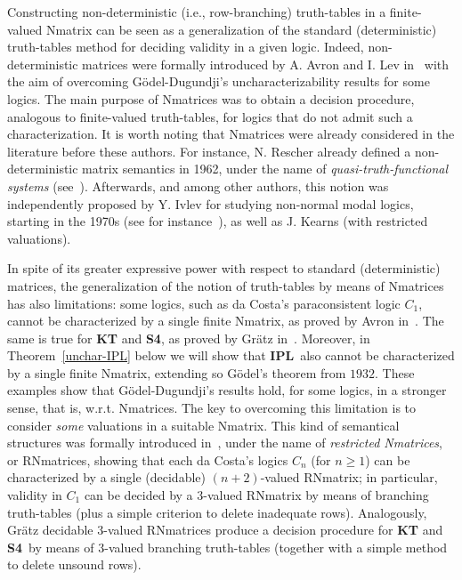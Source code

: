 \documentclass[12pt]{article}
\newcommand{\ipl}{\ensuremath{\mathbf{IPL}}}
\newcommand{\sfo}{\textbf{S4}}
\begin{document}
Constructing non-deterministic (i.e., row-branching) truth-tables in a finite-valued Nmatrix can be seen as a generalization of the standard (deterministic) truth-tables method for deciding validity in a given logic. 
Indeed, non-deterministic matrices were formally introduced by A. Avron and I. Lev in~\cite{avr:lev:01} with the aim of overcoming G\"odel-Dugundji's uncharacterizability results for some logics. The main purpose of Nmatrices was to obtain a decision procedure, analogous to finite-valued truth-tables, for logics that do not admit such a characterization.  It is worth noting that Nmatrices were already considered in the literature before these authors. For instance, N. Rescher already defined a non-deterministic matrix semantics in 1962, under the name of {\em quasi-truth-functional systems} (see~\cite{resch:62}). Afterwards, and among other authors,  this notion was independently proposed by Y. Ivlev for studying non-normal modal logics, starting in the 1970s (see for instance~\cite{ivl:73,ivl:86,ivl:88,ivl:24}), as well as J. Kearns (with restricted valuations).

In spite of its greater expressive power with respect to standard (deterministic) matrices, the generalization of the notion of truth-tables by means of Nmatrices has also limitations:  some logics, such as da Costa's paraconsistent logic $C_1$, cannot be characterized by a single finite Nmatrix, as proved by Avron in~\cite[Theorem~11]{avron:2007}.
The same is true for  \textbf{KT} and \textbf{S4}, as proved by Gr\"atz in~\cite{gratz_truth_2022}. Moreover, in Theorem~\ref{unchar-IPL} below we will show that \ipl\ also cannot be characterized by a single finite Nmatrix, extending so G\"odel's theorem from $1932$. These examples show that G\"odel-Dugundji's results hold, for some logics, in a stronger sense, that is,  w.r.t. Nmatrices. The key to overcoming this limitation is to consider {\em some} valuations in a suitable Nmatrix. This kind of semantical structures was formally introduced in~\cite{coniglio_two_2022}, under the name of {\em restricted Nmatrices}, or RNmatrices,  showing that each da Costa's logics $C_n$ (for $n \geq 1$) can be characterized by a single (decidable) $(n+2)$-valued RNmatrix; in particular, validity in $C_1$ can be decided by a $3$-valued RNmatrix by means of branching truth-tables (plus a simple criterion to delete inadequate rows).  Analogously, Gr\"atz decidable $3$-valued RNmatrices produce a decision procedure for \textbf{KT} and \sfo\ by means of $3$-valued branching truth-tables  (together with a simple method to delete unsound rows).
\end{document}
